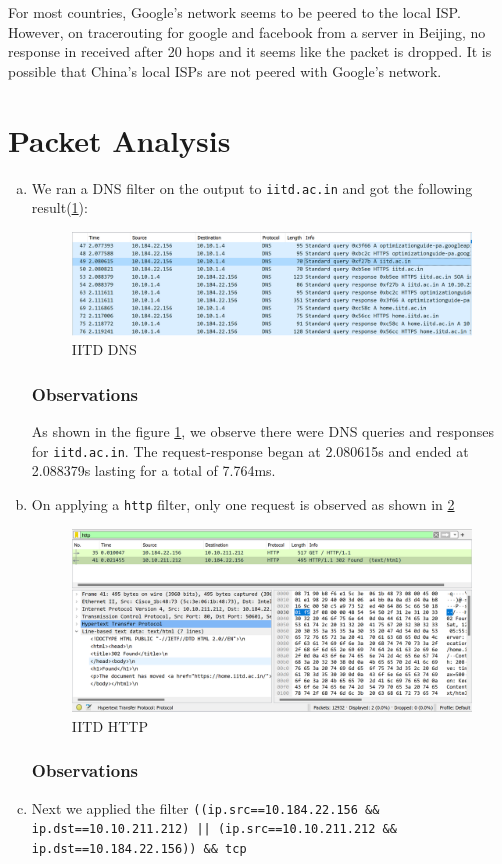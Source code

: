 \documentclass{article}
\begin{document}
For most countries, Google's network seems to be peered to the local ISP. However, on tracerouting for google and facebook from a 
server in Beijing, no response in received after 20 hops and it seems like the packet is dropped. It is possible that China's local 
ISPs are not peered with Google's network.

\clearpage

\section{Packet Analysis}
\begin{enumerate}[a.]
    \item We ran a DNS filter on the output to {\tt iitd.ac.in} and got the following result(\cref{fig:IITDDNS}):
    \begin{figure}[!ht]
        \centering
        \includegraphics[scale=0.5]{images/IITD dns.png}
        \caption{IITD DNS}
        \label{fig:IITDDNS}
    \end{figure}
    \subsubsection*{Observations}
    As shown in the figure \cref{fig:IITDDNS}, we observe there were DNS queries and responses for {\tt iitd.ac.in}. The request-response began at 2.080615s and ended at 2.088379s lasting for a total of 7.764ms. 

    \item On applying a {\tt http} filter, only one request is observed as shown in \cref{fig:IITDHTTP}
    \begin{figure}[!ht]
        \centering
        \includegraphics[scale=0.5]{images/IITD http.png}
        \caption{IITD HTTP}
        \label{fig:IITDHTTP}
    \end{figure}
    \subsubsection*{Observations}
    
    \item Next we applied the filter {\tt ((ip.src==10.184.22.156 \&\& ip.dst==10.10.211.212) || (ip.src==10.10.211.212 \&\& ip.dst==10.184.22.156)) \&\& tcp}
\end{enumerate}
\clearpage

\end{document}
